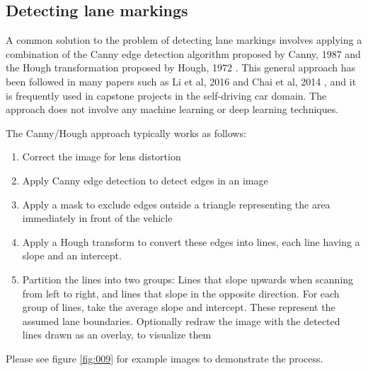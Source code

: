 \documentclass[11pt,twoside]{report}
\begin{document}
\subsection{Detecting lane markings}
\label{s:rq4b}

A common solution to the problem of detecting lane markings involves applying a combination of the Canny edge detection algorithm proposed by Canny, 1987 \cite{canny} and the Hough transformation proposed by Hough, 1972 \cite{hough}.  This general approach has been followed in many papers such as Li et al, 2016 \cite{canny_example} and Chai et al, 2014 \cite{canny_example2}, and it is frequently used in capstone projects in the self-driving car domain.  The approach does not involve any machine learning or deep learning techniques.

The Canny/Hough approach typically works as follows:

\begin{enumerate}[label=\alph*.]
\item{Correct the image for lens distortion}
\item{Apply Canny edge detection to detect edges in an image \cite{canny}}
\item{Apply a mask to exclude edges outside a triangle representing the area immediately in front of the vehicle}
\item{Apply a Hough transform \cite{hough} to convert these edges into lines, each line having a slope and an intercept.}
\item{Partition the lines into two groups:  Lines that slope upwards when scanning from left to right, and lines that slope in the opposite direction.  For each group of lines, take the average slope and intercept.  These represent the assumed lane boundaries.  Optionally redraw the image with the detected lines drawn as an overlay, to visualize them}
\end{enumerate}

Please see figure \ref{fig:009} for example images to demonstrate the process.
\\
\end{document}
